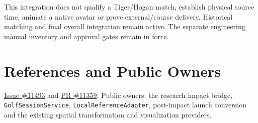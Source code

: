 \documentclass[11pt]{article}
\newcommand{\code}[1]{\nolinkurl{#1}}
\begin{document}
This integration does not qualify a Tiger/Hogan match, establish physical source
time, animate a native avatar or prove external/course delivery. Historical
matching and final overall integration remain active. The separate engineering
manual inventory and approval gates remain in force.

\section*{References and Public Owners}
\href{https://github.com/D-sorganization/UpstreamDrift/issues/11493}{Issue \#11493}
and \href{https://github.com/D-sorganization/UpstreamDrift/pull/11359}{PR \#11359}.
Public owners: the research impact bridge, \code{GolfSessionService},
\code{LocalReferenceAdapter}, post-impact launch conversion and the existing
spatial transformation and visualization providers.
\end{document}
